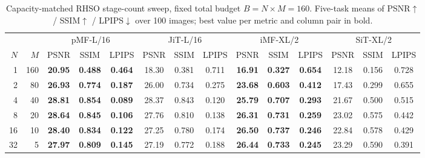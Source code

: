 
\begin{table}[t]
\centering
\small
\setlength{\tabcolsep}{4pt}
\caption{Capacity-matched RHSO stage-count sweep, fixed total budget $B = N \times M = 160$. Five-task means of PSNR$\uparrow$ / SSIM$\uparrow$ / LPIPS$\downarrow$ over 100 images; best value per metric and column pair in bold.}
\label{tab:capacity_fixedB}
\begin{tabular}{rrcccccccccccc}
\toprule
& & \multicolumn{3}{c}{pMF-L/16} & \multicolumn{3}{c}{JiT-L/16} & \multicolumn{3}{c}{iMF-XL/2} & \multicolumn{3}{c}{SiT-XL/2} \\
\cmidrule(lr){3-5} \cmidrule(lr){6-8} \cmidrule(lr){9-11} \cmidrule(lr){12-14}
$N$ & $M$ & PSNR & SSIM & LPIPS & PSNR & SSIM & LPIPS & PSNR & SSIM & LPIPS & PSNR & SSIM & LPIPS \\
\midrule
1 & 160 & \textbf{20.95} & \textbf{0.488} & \textbf{0.464} & 18.30 & 0.381 & 0.711 & \textbf{16.91} & \textbf{0.327} & \textbf{0.654} & 12.18 & 0.156 & 0.728 \\
2 & 80 & \textbf{26.93} & \textbf{0.774} & \textbf{0.187} & 26.00 & 0.734 & 0.275 & \textbf{23.68} & \textbf{0.603} & \textbf{0.412} & 17.43 & 0.299 & 0.655 \\
4 & 40 & \textbf{28.81} & \textbf{0.854} & \textbf{0.089} & 28.37 & 0.843 & 0.120 & \textbf{25.79} & \textbf{0.707} & \textbf{0.293} & 21.67 & 0.500 & 0.515 \\
8 & 20 & \textbf{28.64} & \textbf{0.845} & \textbf{0.106} & 27.76 & 0.810 & 0.138 & \textbf{26.31} & \textbf{0.731} & \textbf{0.259} & 23.02 & 0.575 & 0.442 \\
16 & 10 & \textbf{28.40} & \textbf{0.834} & \textbf{0.122} & 27.25 & 0.780 & 0.174 & \textbf{26.50} & \textbf{0.737} & \textbf{0.246} & 22.84 & 0.578 & 0.429 \\
32 & 5 & \textbf{27.97} & \textbf{0.809} & \textbf{0.145} & 27.19 & 0.772 & 0.188 & \textbf{26.44} & \textbf{0.733} & \textbf{0.245} & 23.29 & 0.590 & 0.391 \\
\bottomrule
\end{tabular}
\end{table}

